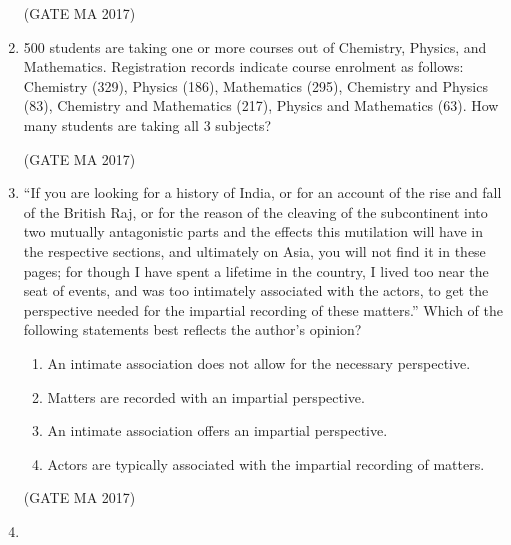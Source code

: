 \documentclass[journal,12pt,onecolumn]{IEEEtran}
\theoremstyle{remark}
\begin{document}
\begin{enumerate}
\begin{enumerate}
\end{enumerate}
\hfill (GATE MA 2017)
\item
500 students are taking one or more courses out of Chemistry, Physics, and Mathematics. Registration records indicate course enrolment as follows: Chemistry (329), Physics (186), Mathematics (295), Chemistry and Physics (83), Chemistry and Mathematics (217), Physics and Mathematics (63). How many students are taking all 3 subjects?
\begin{enumerate}
\end{enumerate}
\hfill (GATE MA 2017)
\item
“If you are looking for a history of India, or for an account of the rise and fall of the British Raj, or for the reason of the cleaving of the subcontinent into two mutually antagonistic parts and the effects this mutilation will have in the respective sections, and ultimately on Asia, you will not find it in these pages; for though I have spent a lifetime in the country, I lived too near the seat of events, and was too intimately associated with the actors, to get the perspective needed for the impartial recording of these matters.”
Which of the following statements best reflects the author’s opinion?
\begin{enumerate}
\item An intimate association does not allow for the necessary perspective.
\item Matters are recorded with an impartial perspective.
\item An intimate association offers an impartial perspective.
\item Actors are typically associated with the impartial recording of matters.
\end{enumerate}
\hfill (GATE MA 2017)
\item

\end{enumerate}
\end{document}
